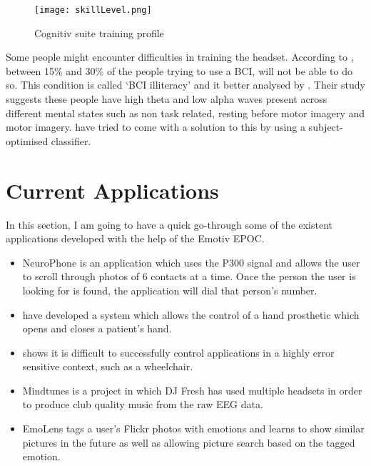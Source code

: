\begin{figure}
  \centering
  \texttt{[image: skillLevel.png]}
  \caption{Cognitiv suite training profile}
    \label{fig:skillLevelMe}          
\end{figure}

Some people might encounter difficulties in training the headset. According to \cite{cureBCIilliteracy}, between 15\% and 30\% of the people trying to use a BCI, will not be able to do so. This condition is called `BCI illiteracy' and it better analysed by \cite{BCIilliteracy}. Their study suggests these people have high theta and low alpha waves present across different mental states such as non task related, resting before motor imagery and motor imagery. \cite{cureBCIilliteracy} have tried to come with a solution to this by using a subject-optimised classifier.

\section{Current Applications}
In this section, I am going to have a quick go-through some of the existent applications developed with the help of the Emotiv EPOC.

\begin{itemize}
	\item NeuroPhone \cite{neurophone} is an application which uses the P300 signal and allows the user to scroll through photos of 6 contacts at a time. Once the person the user is looking for is found, the application will dial that person's number.
	\item \cite{handOrthotic} have developed a system which allows the control of a hand prosthetic which opens and closes a patient's hand.
	\item \cite{wheelchairEEG} shows it is difficult to successfully control applications in a highly error sensitive context, such as a wheelchair. 
	\item Mindtunes \cite{mindtunes} is a project in which DJ Fresh has used multiple headsets in order to produce club quality music from the raw EEG data.   
	\item EmoLens \cite{emoLens} tags a user's Flickr photos with emotions and learns to show similar pictures in the future as well as allowing picture search based on the tagged emotion.
\end{itemize}
